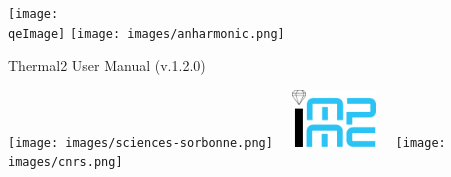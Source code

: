 \begin{center}
\def\version{1.2.0}
\def\qeImage{images/qe.png}


  \texttt{[image: \\qeImage]}
  \hspace{2cm} 
  \texttt{[image: images/anharmonic.png]}
  
	       \vspace{5.5cm}
  \Huge Thermal2 User Manual (v.\version) 
  \vspace{5.5cm}

  \texttt{[image: images/sciences-sorbonne.png]}
  \hspace{2cm} 
  \includegraphics[width=3cm,height=1.5cm,keepaspectratio]{images/impmc.png}
  \hspace{2cm} 
  \texttt{[image: images/cnrs.png]}

\end{center}
